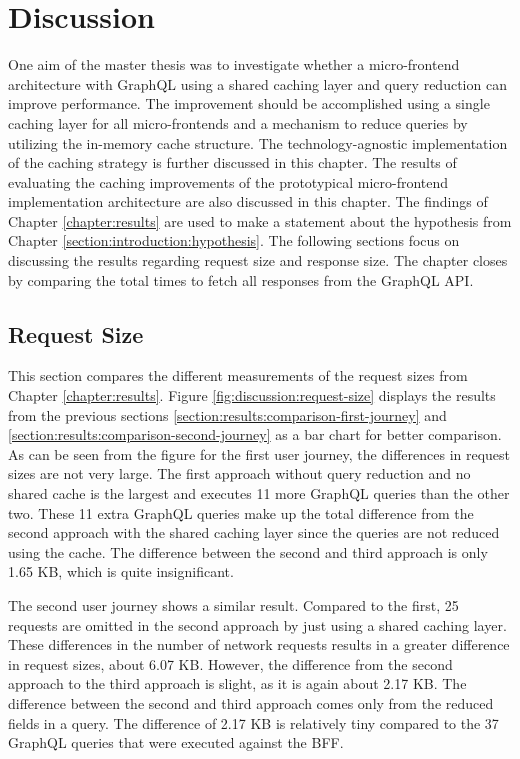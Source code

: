 \chapter{Discussion}\label{chapter:discussion}

One aim of the master thesis was to investigate whether a micro-frontend architecture with GraphQL using a shared caching layer and query reduction can improve performance. The improvement should be accomplished using a single caching layer for all micro-frontends and a mechanism to reduce queries by utilizing the in-memory cache structure. The technology-agnostic implementation of the caching strategy is further discussed in this chapter. The results of evaluating the caching improvements of the prototypical micro-frontend implementation architecture are also discussed in this chapter. The findings of Chapter \ref{chapter:results} are used to make a statement about the hypothesis from Chapter \ref{section:introduction:hypothesis}. The following sections focus on discussing the results regarding request size and response size. The chapter closes by comparing the total times to fetch all responses from the GraphQL \ac{API}.

\section{Request Size}\label{section:discussion:request-size}

This section compares the different measurements of the request sizes from Chapter \ref{chapter:results}. Figure \ref{fig:discussion:request-size} displays the results from the previous sections \ref{section:results:comparison-first-journey} and \ref{section:results:comparison-second-journey} as a bar chart for better comparison. As can be seen from the figure for the first user journey, the differences in request sizes are not very large. The first approach without query reduction and no shared cache is the largest and executes 11 more GraphQL queries than the other two. These 11 extra GraphQL queries make up the total difference from the second approach with the shared caching layer since the queries are not reduced using the cache. The difference between the second and third approach is only 1.65 KB, which is quite insignificant.

\bigskip

\noindent The second user journey shows a similar result. Compared to the first, 25 requests are omitted in the second approach by just using a shared caching layer. These differences in the number of network requests results in a greater difference in request sizes, about 6.07 KB. However, the difference from the second approach to the third approach is slight, as it is again about 2.17 KB. The difference between the second and third approach comes only from the reduced fields in a query. The difference of 2.17 KB is relatively tiny compared to the 37 GraphQL queries that were executed against the \ac{BFF}.


